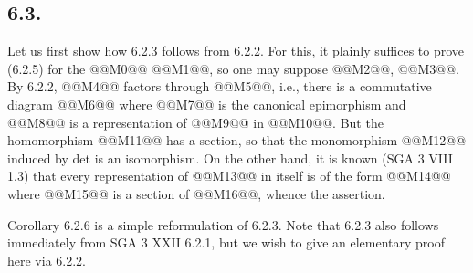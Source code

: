 
\subsection*{6.3.}
Let us first show how 6.2.3 follows from 6.2.2. For this, it plainly suffices to prove (6.2.5) for the
@@M0@@ @@M1@@, so one may suppose @@M2@@, @@M3@@. By 6.2.2, @@M4@@ factors through @@M5@@, i.e., there is a commutative diagram
@@M6@@
where @@M7@@ is the canonical epimorphism and @@M8@@ is a representation of @@M9@@ in @@M10@@. But the homomorphism
@@M11@@
has a section, so that the monomorphism
@@M12@@
induced by det is an isomorphism. On the other hand, it is known (SGA 3 VIII 1.3) that every representation of @@M13@@ in itself is of the form
@@M14@@
where @@M15@@ is a section of @@M16@@, whence the assertion.

Corollary 6.2.6 is a simple reformulation of 6.2.3. Note that 6.2.3 also follows immediately from SGA 3 XXII 6.2.1, but we wish to give an elementary proof here via 6.2.2.
